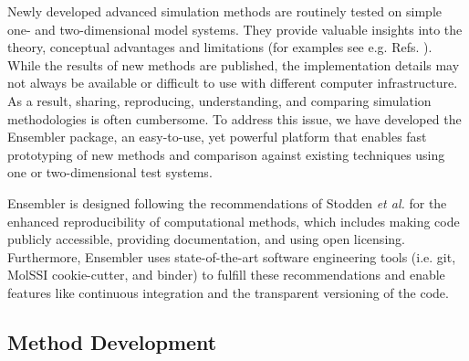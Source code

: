 Newly developed advanced simulation methods are routinely tested on simple one- and two-dimensional model systems. They provide valuable insights into the theory, conceptual advantages and limitations (for examples see e.g. Refs. \cite{Huber1994, Laio2002, Christ2007, Konig2012, Koenig2020, Donnini2016, Weiss2016, Lemke2018}).
While the results of new methods are published, the implementation details may not always be available or difficult to use with different computer infrastructure.
As a result, sharing, reproducing, understanding, and comparing simulation methodologies is often cumbersome.\cite{Peng2011}
To address this issue, we have developed the Ensembler package, an easy-to-use, yet powerful platform that enables fast prototyping of new methods and comparison against existing techniques using one or two-dimensional test systems.

Ensembler is designed following the recommendations of Stodden \textit{et al.}\cite{Stodden2016} for the enhanced reproducibility of computational methods, which includes making code publicly accessible, providing documentation, and using open licensing.\cite{Stodden2016} 
Furthermore, Ensembler uses state-of-the-art software engineering tools (i.e. git,\cite{Chacon2014} MolSSI cookie-cutter,\cite{Naden2018} and binder\cite{Binder2018}) to fulfill these recommendations and enable features like continuous integration and the transparent versioning of the code. 

\subsection{Method Development}

